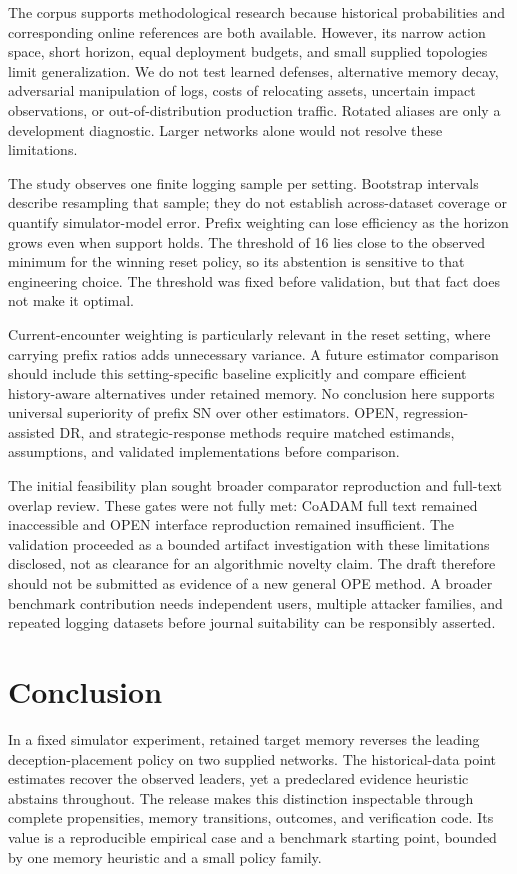 \documentclass[sigconf,nonacm]{acmart}
\begin{document}
The corpus supports methodological research because historical probabilities and corresponding online references are both available. However, its narrow action space, short horizon, equal deployment budgets, and small supplied topologies limit generalization. We do not test learned defenses, alternative memory decay, adversarial manipulation of logs, costs of relocating assets, uncertain impact observations, or out-of-distribution production traffic. Rotated aliases are only a development diagnostic. Larger networks alone would not resolve these limitations.

The study observes one finite logging sample per setting. Bootstrap intervals describe resampling that sample; they do not establish across-dataset coverage or quantify simulator-model error. Prefix weighting can lose efficiency as the horizon grows even when support holds. The threshold of 16 lies close to the observed minimum for the winning reset policy, so its abstention is sensitive to that engineering choice. The threshold was fixed before validation, but that fact does not make it optimal.

Current-encounter weighting is particularly relevant in the reset setting, where carrying prefix ratios adds unnecessary variance. A future estimator comparison should include this setting-specific baseline explicitly and compare efficient history-aware alternatives under retained memory. No conclusion here supports universal superiority of prefix SN over other estimators. OPEN, regression-assisted DR, and strategic-response methods require matched estimands, assumptions, and validated implementations before comparison.

The initial feasibility plan sought broader comparator reproduction and full-text overlap review. These gates were not fully met: CoADAM full text remained inaccessible and OPEN interface reproduction remained insufficient. The validation proceeded as a bounded artifact investigation with these limitations disclosed, not as clearance for an algorithmic novelty claim. The draft therefore should not be submitted as evidence of a new general OPE method. A broader benchmark contribution needs independent users, multiple attacker families, and repeated logging datasets before journal suitability can be responsibly asserted.

\section{Conclusion}
In a fixed simulator experiment, retained target memory reverses the leading deception-placement policy on two supplied networks. The historical-data point estimates recover the observed leaders, yet a predeclared evidence heuristic abstains throughout. The release makes this distinction inspectable through complete propensities, memory transitions, outcomes, and verification code. Its value is a reproducible empirical case and a benchmark starting point, bounded by one memory heuristic and a small policy family.
\end{document}
